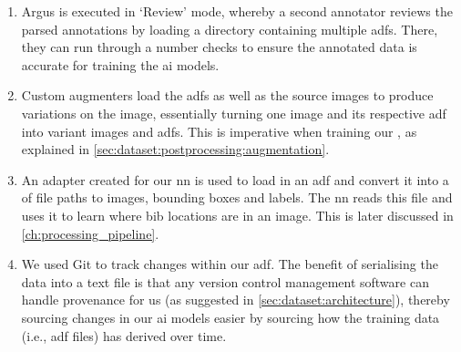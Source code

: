 \begin{enumerate}
  \item Argus is executed in `Review' mode, whereby a second annotator reviews the parsed annotations by loading a directory containing multiple \glspl{adf}. There, they can run through a number checks to ensure the annotated data is accurate for training the \gls{ai} models.
  \item Custom augmenters load the \glspl{adf} as well as the source images to produce variations on the image, essentially turning one image and its respective \gls{adf} into variant images and \glspl{adf}. This is imperative when training our , as explained in \cref{sec:dataset:postprocessing:augmentation}.
  \item An adapter created for our \gls{nn} is used to load in an \gls{adf} and convert it into a  of file paths to images, bounding boxes and labels. The \gls{nn} reads this file and uses it to learn where bib locations are in an image. This is later discussed in \cref{ch:processing_pipeline}.
  \item We used Git to track changes within our \gls{adf}. The benefit of serialising the data into a text file is that any version control management software can handle provenance for us (as suggested in \cref{sec:dataset:architecture}), thereby sourcing changes in our \gls{ai} models easier by sourcing how the training data (i.e., \gls{adf} files) has derived over time.
\end{enumerate}





